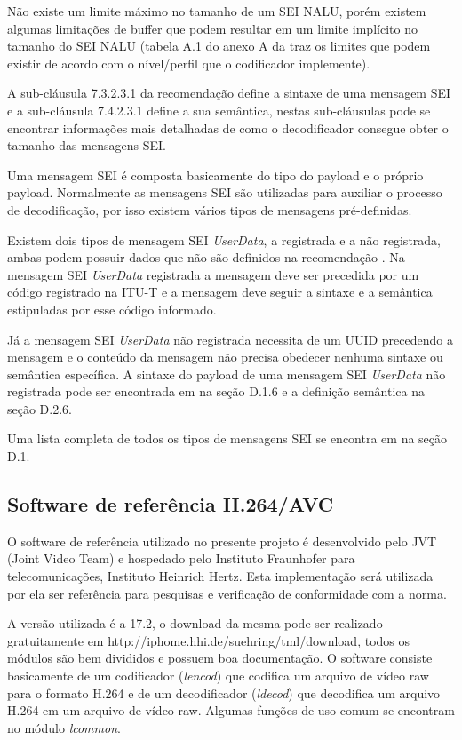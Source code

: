 Não existe um limite máximo no tamanho de um SEI NALU, porém existem algumas limitações de buffer que podem resultar em um limite implícito no tamanho do SEI NALU (tabela A.1 do anexo A da \cite{ituh264avc} traz os limites que podem existir de acordo com o nível/perfil que o codificador implemente).

A sub-cláusula 7.3.2.3.1 da recomendação \cite{ituh264avc} define a sintaxe de uma mensagem SEI e a sub-cláusula 7.4.2.3.1 define a sua semântica, nestas sub-cláusulas pode se encontrar informações mais detalhadas de como o decodificador consegue obter o tamanho das mensagens SEI.

Uma mensagem SEI é composta basicamente do tipo do payload e o próprio payload. Normalmente as mensagens SEI são utilizadas para auxiliar o processo de decodificação, por isso existem vários tipos de mensagens pré-definidas. 

Existem dois tipos de mensagem SEI \textit{UserData}, a registrada e a não registrada, ambas podem possuir dados que não são definidos na recomendação \cite{ituh264avc}. Na mensagem SEI \textit{UserData} registrada a mensagem deve ser precedida por um código registrado na ITU-T e a mensagem deve seguir a sintaxe e a semântica estipuladas por esse código informado. 

Já a mensagem SEI \textit{UserData} não registrada necessita de um UUID precedendo a mensagem e o conteúdo da mensagem não precisa obedecer nenhuma sintaxe ou semântica específica. A sintaxe do payload de uma mensagem SEI \textit{UserData} não registrada pode ser encontrada em \cite{ituh264avc} na seção D.1.6 e a definição semântica na seção D.2.6.

Uma lista completa de todos os tipos de mensagens SEI se encontra em \cite{ituh264avc} na seção D.1.


\subsection{Software de referência H.264/AVC}

O software de referência utilizado no presente projeto é desenvolvido pelo JVT (Joint Video Team) e hospedado pelo Instituto Fraunhofer para telecomunicações, Instituto Heinrich Hertz. Esta implementação será utilizada por ela ser referência para pesquisas e verificação de conformidade com a norma. 

A versão utilizada é a 17.2, o download da mesma pode ser realizado gratuitamente em http://iphome.hhi.de/suehring/tml/download, todos os módulos são bem divididos e possuem boa documentação. O software consiste basicamente de um codificador (\textit{lencod}) que codifica um arquivo de vídeo raw para o formato H.264 e de um decodificador (\textit{ldecod}) que decodifica um arquivo H.264 em um arquivo de vídeo raw. Algumas funções de uso comum se encontram no módulo \textit{lcommon}.



